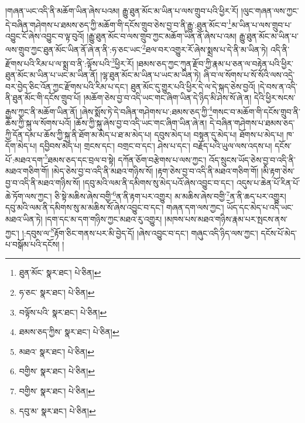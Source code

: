།གཞན་ཡང་འདི་ནི་མཆོག་ཡིན་ཞེས་པའམ། རྒྱུ་ཐུན་མོང་མ་ཡིན་པ་ལས་གྲུབ་པའི་ཕྱིར་རོ། །ལུང་གཞན་ལས་ཀྱང་དེ་བཞིན་གཤེགས་པ་ཐམས་ཅད་ཀྱི་མཆོག་གི་དངོས་གྲུབ་ཅེས་བྱ་བ་ནི་རྒྱུ་:ཐུན་མོང་བ་\footnote{ཐུན་མོང་  སྣར་ཐང་།  པེ་ཅིན། }མ་ཡིན་པ་ལས་གྲུབ་པ་འབྱུང་ངོ་ཞེས་འབྱུང་བ་ལྟ་བུའོ། །རྒྱུ་ཐུན་མོང་བ་ལས་གྲུབ་ཀྱང་མཆོག་ཡིན་ནོ་ཞེས་པ་འམ། རྒྱུ་ཐུན་མོང་མ་ཡིན་པ་ལས་གྲུབ་ཀྱང་ཐུན་མོང་ཡིན་ནོ་ཞེ་ན་ནི་:ཧ་ཅང་ཡང་\footnote{ཧ་ཅང་  སྣར་ཐང་།  པེ་ཅིན། }ཐལ་བར་འགྱུར་རོ་ཞེས་སྨྲས་པ་དེ་ནི་མ་ཡིན་ཏེ། འདི་ནི་རྫོགས་པའི་རིམ་པ་ལ་སྨྲ་བ་ནི་:ལྟོས་པའི་\footnote{བལྟོས་པའི་  སྣར་ཐང་།  པེ་ཅིན། }ཕྱིར་རོ། །ཐམས་ཅད་ཀྱང་ཀུན་རྫོབ་ཀྱི་རྣམ་པ་ཅན་ལ་བརྟེན་པའི་ཕྱིར་ཐུན་མོང་མ་ཡིན་པ་ཡང་མ་ཡིན་ནོ། །ལྷ་ཐུན་མོང་མ་ཡིན་པ་ཡང་མ་ཡིན་ཏེ། ཞི་བ་ལ་སོགས་པ་སོ་སོའི་ལས་འདྲེ་བར་བྱེད་ཅིང་འོན་ཀྱང་རྫོགས་པའི་རིམ་པ་དང་། ཐུན་མོང་དུ་གྱུར་པའི་ཕྱིར་དེ་ལ་དེ་སྐད་ཅེས་བྱའོ། །དེ་བས་ན་འདི་ནི་ཐུན་མོང་གི་དངོས་གྲུབ་པོ། །མཆོག་ཅེས་བྱ་བ་འདི་ཡང་གང་ཞིག་ཡིན་དེ་ཉིད་མི་ཤེས་སོ་ཞེ་ན། དེའི་ཕྱིར་སངས་རྒྱས་ཀྱང་ནི་མཆོག་ཡིན་ནོ། །ཞེས་སྨོས་ཏེ་དེ་བཞིན་གཤེགས་པ་:ཐམས་ཅད་ཀྱི་\footnote{ཐམས་ཅད་ཀྱིས་  སྣར་ཐང་།  པེ་ཅིན། }གསང་བ་མཆོག་གི་དངོས་གྲུབ་ནི་ཆོས་ཀྱི་སྐུ་ལ་སོགས་པའོ། །ཆོས་ཀྱི་སྐུ་ཞེས་བྱ་བ་འདི་ཡང་གང་ཞིག་ཡིན་ཞེ་ན། དེ་བཞིན་གཤེགས་པ་ཐམས་ཅད་ཀྱི་དོན་དམ་པ་ཆོས་ཀྱི་སྐུ་ནི་ཐོག་མ་མེད་པ་ཐ་མ་མེད་པ། དབུས་མེད་པ། བསྟན་དུ་མེད་པ། ཐོགས་པ་མེད་པ། ཁ་དོག་མེད་པ། དབྱིབས་མེད་པ། གྲངས་དང་། བགྲང་བ་དང་། ཤེས་པ་དང་། བརྗོད་པའི་ཡུལ་ལས་འདས་པ། དངོས་པོ་:མཐའ་དག་\footnote{མཐའ་  སྣར་ཐང་།  པེ་ཅིན། }ཐམས་ཅད་དང་བྲལ་བ་སྟེ། དཀོན་ཅོག་བརྩེགས་པ་ལས་ཀྱང་། འོད་སྲུངས་ཡོད་ཅེས་བྱ་བ་འདི་ནི་མཐའ་གཅིག་གོ། །མེད་ཅེས་བྱ་བ་འདི་ནི་མཐའ་གཉིས་སོ། །རྟག་ཅེས་བྱ་བ་འདི་ནི་མཐའ་གཅིག་གོ། །མི་རྟག་ཅེས་བྱ་བ་འདི་ནི་མཐའ་གཉིས་སོ། །དབུ་མའི་ལམ་ནི་དམིགས་སུ་མེད་པའོ་ཞེས་འབྱུང་བ་དང་། འདུས་པ་ཆེན་པོ་རིན་པོ་ཆེ་ཏོག་ལས་ཀྱང་། ཅི་སྟེ་མཆིས་ཞེས་བགྱི་\footnote{བགྱིས་  སྣར་ཐང་།  པེ་ཅིན། }ན་ནི་རྟག་པར་འགྱུར། མ་མཆིས་ཞེས་བགྱི་\footnote{བགྱིས་  སྣར་ཐང་།  པེ་ཅིན། }ན་ནི་ཆད་པར་འགྱུར། དབུ་མའི་ལམ་ནི་དམིགས་སུ་མ་མཆིས་སོ་ཞེས་འབྱུང་བ་དང་། གཞན་དག་ལས་ཀྱང་། ཡོད་དང་མེད་པ་འདི་ཡང་མཐའ་ཡིན་ཏེ། །དག་དང་མ་དག་གཉིས་ཀྱང་མཐའ་རུ་འགྱུར། །མཁས་པས་མཐའ་གཉིས་རྣམ་པར་སྤངས་ནས་ཀྱང་། །:དབུས་ལ་\footnote{དབུ་མ་  སྣར་ཐང་།  པེ་ཅིན། }རྟོག་ཅིང་གནས་པར་མི་བྱེད་དོ། །ཞེས་འབྱུང་བ་དང་། གཞུང་འདི་ཉིད་ལས་ཀྱང་། དངོས་པོ་མེད་པ་བསྒོམ་པའི་དངོས། །
